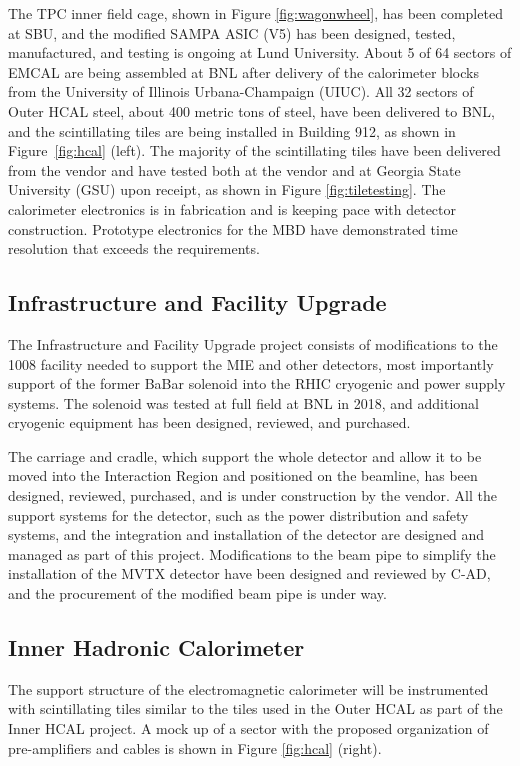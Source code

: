 The TPC inner field cage, shown in Figure \ref{fig:wagonwheel}, has been completed at SBU, and the modified SAMPA ASIC (V5)
has been designed, tested, manufactured, and testing is ongoing at Lund University.
About 5 of 64 sectors of EMCAL are being assembled at BNL after delivery of the
calorimeter blocks from the University of Illinois Urbana-Champaign (UIUC).
All 32 sectors of Outer HCAL steel, about 400 metric tons of steel,
have been delivered to BNL, and the scintillating tiles are being installed
in Building 912, as shown in Figure~\ref{fig:hcal} (left).
The majority of the scintillating tiles have been delivered from the vendor
and have tested both at the vendor and at Georgia State University (GSU) upon receipt, as shown in Figure \ref{fig:tiletesting}.
The calorimeter electronics is in fabrication and is keeping pace with detector
construction.
Prototype electronics for the MBD have demonstrated time resolution that exceeds the
requirements.

\subsection{Infrastructure and Facility Upgrade}

The Infrastructure and Facility Upgrade project consists of modifications to the 
1008 facility needed to support the MIE and other detectors, most importantly 
support of the former BaBar solenoid into the RHIC cryogenic and power supply
systems.  
The solenoid was tested at full field at BNL in 2018, and additional cryogenic
equipment has been designed, reviewed, and purchased.

The carriage and cradle, which support the whole detector and allow it to be 
moved into the Interaction Region and positioned on the beamline, has been designed,
reviewed, purchased, and is under construction by the vendor.
All the support systems for the detector, such as the power distribution and safety systems, and the integration and installation of the detector are designed and managed as part of this project.
Modifications to the beam pipe to simplify the installation of the MVTX detector
have been designed and reviewed by C-AD, and the procurement of the modified beam pipe 
is under way.

\subsection{Inner Hadronic Calorimeter}

The support structure of the electromagnetic calorimeter will be instrumented
with scintillating tiles similar to the tiles used in the Outer HCAL as part of the
Inner HCAL project. 
A mock up of a sector with the proposed organization of pre-amplifiers and cables is shown in Figure \ref{fig:hcal} (right).

